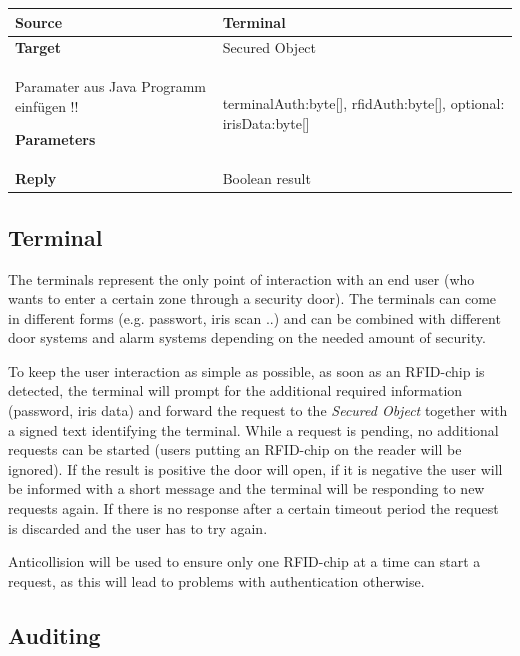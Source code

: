 \documentclass[12pt,a4paper,titlepage,oneside]{scrartcl}
\begin{document}
\begin{table}[h]

    \centering

    \begin{tabular}{|l|p{12cm}|} \hline

    \textbf{Source}&Terminal\\ \hline

    \textbf{Target}&Secured Object\\ \hline

Paramater aus Java Programm einfügen !!

    \textbf{Parameters}&terminalAuth:byte[], rfidAuth:byte[], optional: irisData:byte[]\\ \hline

    \textbf{Reply}&Boolean result\\ \hline

    \end{tabular}

\end{table}

\subsection{Terminal}

The terminals represent the only point of interaction with an end user (who wants to enter a certain zone through a security door). The terminals can come in different forms (e.g. passwort, iris scan ..) and can be combined with different door systems and alarm systems depending on the needed amount of security.

To keep the user interaction as simple as possible, as soon as an RFID-chip is detected, the terminal will prompt for the additional required information (password, iris data) and forward the request to the \emph{Secured Object} together with a signed text identifying the terminal. While a request is pending, no additional requests can be started (users putting an RFID-chip on the reader will be ignored). If the result is positive the door will open, if it is negative the user will be informed with a short message and the terminal will be responding to new requests again. If there is no response after a certain timeout period the request is discarded and the user has to try again.

Anticollision will be used to ensure only one RFID-chip at a time can start a request, as this will lead to problems with authentication otherwise.

\subsection{Auditing}
\end{document}
